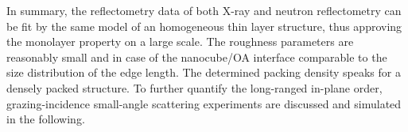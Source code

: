 \documentclass[\main/dresen_thesis.tex]{subfiles}
\begin{document}
  \label{sec:monolayers:structuralCharacterization:summary}
  
  In summary, the reflectometry data of both X-ray and neutron reflectometry can be fit by the same model of an homogeneous thin layer structure, thus approving the monolayer property on a large scale.
  The roughness parameters are reasonably small and in case of the nanocube/OA interface comparable to the size distribution of the edge length.
  The determined packing density speaks for a densely packed structure.
  To further quantify the long-ranged in-plane order, grazing-incidence small-angle scattering experiments are discussed and simulated in the following.
  
\end{document}
